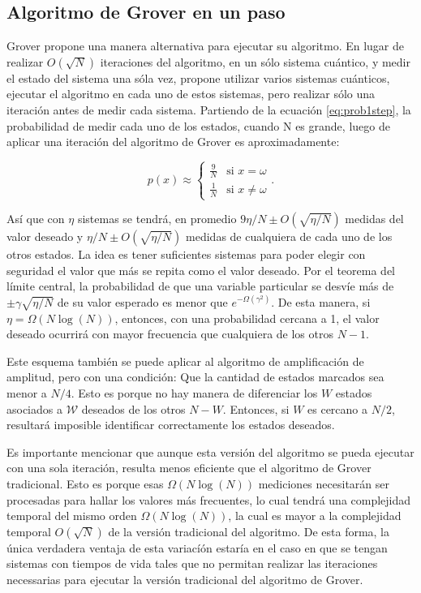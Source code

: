 \subsection{Algoritmo de Grover en un paso}

Grover \cite{Grover_1997s} propone una manera alternativa para ejecutar su algoritmo. En lugar de realizar $O(\sqrt{N})$ iteraciones del algoritmo, en un sólo sistema cuántico, y medir el estado del sistema una sóla vez, propone utilizar varios sistemas cuánticos, ejecutar el algoritmo en cada uno de estos sistemas, pero realizar sólo una iteración antes de medir cada sistema. Partiendo de la ecuación \ref{eq:prob1step}, la probabilidad de medir cada uno de los estados, cuando N es grande, luego de aplicar una iteración del algoritmo de Grover es aproximadamente:

\begin{equation}
    p(x) \approx
    \begin{cases}
        \frac{9}{N} & \text{si } x = \omega \\
        \frac{1}{N} & \text{si } x \neq \omega
    \end{cases} .
\end{equation}

Así que con $\eta$ sistemas se tendrá, en promedio $9 \eta/N \pm O(\sqrt{\eta/N})$ medidas del valor deseado y $\eta/N \pm O(\sqrt{\eta/N})$ medidas de cualquiera de cada uno de los otros estados. La idea es tener suficientes sistemas para poder elegir con seguridad el valor que más se repita como el valor deseado. Por el teorema del límite central, la probabilidad de que una variable particular se desvíe más de $\pm \gamma \sqrt{\eta/N}$ de su valor esperado es menor que $e^{- \Omega(\gamma^2)}$. De esta manera, si $\eta = \Omega(N \log(N))$, entonces, con una probabilidad cercana a 1, el valor deseado ocurrirá con mayor frecuencia que cualquiera de los otros $N-1$.

Este esquema también se puede aplicar al algoritmo de amplificación de amplitud, pero con una condición: Que la cantidad de estados marcados sea menor a $N/4$. Esto es porque no hay manera de diferenciar los $W$ estados asociados a $\mathcal{W}$ deseados de los otros $N - W$. Entonces, si $W$ es cercano a $N/2$, resultará imposible identificar correctamente los estados deseados.

Es importante mencionar que aunque esta versión del algoritmo se pueda ejecutar con una sola iteración, resulta menos eficiente que el algoritmo de Grover tradicional. Esto es porque esas $\Omega(N \log(N))$ mediciones necesitarán ser procesadas para hallar los valores más frecuentes, lo cual tendrá una complejidad temporal del mismo orden $\Omega(N \log(N))$, la cual es mayor a la complejidad temporal $O(\sqrt{N})$ de la versión tradicional del algoritmo. De esta forma, la única verdadera ventaja de esta variacíón estaría en el caso en que se tengan sistemas con tiempos de vida tales que no permitan realizar las iteraciones necessarias para ejecutar la versión tradicional del algoritmo de Grover.

